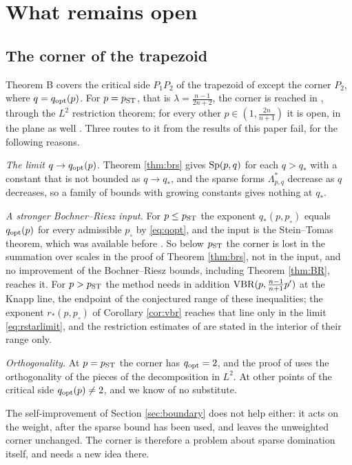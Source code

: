 \section{What remains open}\label{sec:open}

\subsection{The corner of the trapezoid}
Theorem B covers the critical side $P_1P_2$ of the trapezoid of \cite[(1.5)]{BRS25} except the corner
$P_2$, where $q=q_{\rm opt}(p)$. For $p=p_{\rm ST}$, that is $\lambda=\frac{n-1}{2n+2}$, the corner is
reached in \cite[Theorem 1.5]{BRS25}, through the $L^2$ restriction theorem; for every other
$p\in(1,\frac{2n}{n+1})$ it is open, in the plane as well \cite[\S1.2]{BRS25}. Three routes to it
from the results of this paper fail, for the following reasons.

\emph{The limit $q\to q_{\rm opt}(p)$.} Theorem \ref{thm:brs} gives $\mathrm{Sp}(p,q)$ for each $q>q_*$ with a
constant that is not bounded as $q\to q_*$, and the sparse forms $\Lambda^*_{p,q}$ decrease as $q$
decreases, so a family of bounds with growing constants gives nothing at $q_*$.

\emph{A stronger Bochner--Riesz input.} For $p\le p_{\rm ST}$ the exponent $q_*(p,p_\circ)$ equals
$q_{\rm opt}(p)$ for every admissible $p_\circ$ by \eqref{eq:qopt}, and the input is the Stein--Tomas
theorem, which was available before \cite{OAI26}. So below $p_{\rm ST}$ the corner is lost in the
summation over scales in the proof of Theorem \ref{thm:brs}, not in the input, and no improvement of
the Bochner--Riesz bounds, including Theorem \ref{thm:BR}, reaches it. For $p>p_{\rm ST}$ the method
needs in addition $\mathrm{VBR}(p,\frac{n-1}{n+1}p')$ at the Knapp line, the endpoint of the conjectured range
of these inequalities; the exponent $r_*(p,p_\circ)$ of Corollary \ref{cor:vbr} reaches that line only in
the limit \eqref{eq:rstarlimit}, and the restriction estimates of \cite{OAI26} are stated in the
interior of their range only.

\emph{Orthogonality.} At $p=p_{\rm ST}$ the corner has $q_{\rm opt}=2$, and the proof of
\cite[Theorem 1.5]{BRS25} uses the orthogonality of the pieces of the decomposition in $L^2$. At
other points of the critical side $q_{\rm opt}(p)\ne2$, and we know of no substitute.

The self-improvement of Section \ref{sec:boundary} does not help either: it acts on the weight, after
the sparse bound has been used, and leaves the unweighted corner unchanged. The corner is therefore a
problem about sparse domination itself, and needs a new idea there.

